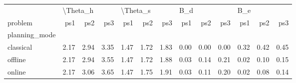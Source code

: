 \begin{tabular}{lrrrrrrrrrrrr}
\toprule
{} & \multicolumn{3}{l}{\textbackslash Theta\_h} & \multicolumn{3}{l}{\textbackslash Theta\_s} & \multicolumn{3}{l}{B\_d} & \multicolumn{3}{l}{B\_e} \\
problem &      ps1 &  ps2 &  ps3 &      ps1 &  ps2 &  ps3 &  ps1 &  ps2 &  ps3 &  ps1 &  ps2 &  ps3 \\
planning\_mode &          &      &      &          &      &      &      &      &      &      &      &      \\
\midrule
classical     &     2.17 & 2.94 & 3.35 &     1.47 & 1.72 & 1.83 & 0.00 & 0.00 & 0.00 & 0.32 & 0.42 & 0.45 \\
offline       &     2.17 & 2.94 & 3.55 &     1.47 & 1.72 & 1.88 & 0.03 & 0.14 & 0.21 & 0.02 & 0.10 & 0.15 \\
online        &     2.17 & 3.06 & 3.65 &     1.47 & 1.75 & 1.91 & 0.03 & 0.11 & 0.20 & 0.02 & 0.08 & 0.14 \\
\bottomrule
\end{tabular}
